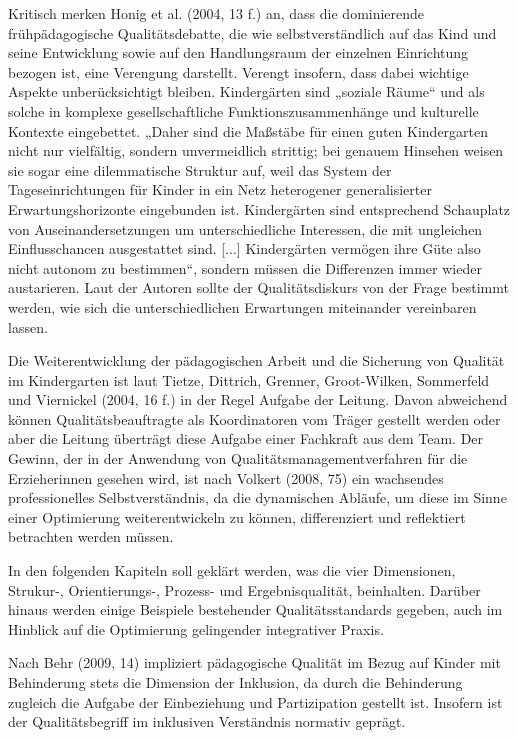 Kritisch merken Honig et al. (2004, 13 f.) an, dass die dominierende frühpädagogische Qualitätsdebatte, die wie selbstverständlich auf das Kind und seine Entwicklung sowie auf den Handlungsraum der einzelnen Einrichtung bezogen ist, eine Verengung darstellt. Verengt insofern, dass dabei wichtige Aspekte unberücksichtigt bleiben. Kindergärten sind „soziale Räume“ und als solche in komplexe gesellschaftliche Funktionszusammenhänge und kulturelle Kontexte eingebettet. „Daher sind die Maßstäbe für einen guten Kindergarten nicht nur vielfältig, sondern unvermeidlich strittig; bei genauem Hinsehen weisen sie sogar eine dilemmatische Struktur auf, weil das System der Tageseinrichtungen für Kinder in ein Netz heterogener generalisierter Erwartungshorizonte eingebunden ist. Kindergärten sind entsprechend Schauplatz von Auseinandersetzungen um unterschiedliche Interessen, die mit ungleichen Einflusschancen ausgestattet sind. [...] Kindergärten vermögen ihre Güte also nicht autonom zu bestimmen“, sondern müssen die Differenzen immer wieder austarieren. 
Laut der Autoren sollte der Qualitätsdiskurs von der Frage bestimmt werden, wie sich die unterschiedlichen Erwartungen miteinander vereinbaren lassen.

Die Weiterentwicklung der pädagogischen Arbeit und die Sicherung von Qualität im Kindergarten ist laut Tietze, Dittrich, Grenner, Groot-Wilken, Sommerfeld und Viernickel (2004, 16 f.) in der Regel Aufgabe der Leitung. Davon abweichend können Qualitätsbeauftragte als Koordinatoren vom Träger gestellt werden oder aber die Leitung überträgt diese Aufgabe einer Fachkraft aus dem Team. 
Der Gewinn, der in der Anwendung von Qualitätsmanagementverfahren für die Erzieherinnen gesehen wird, ist nach Volkert (2008, 75) ein  wachsendes professionelles Selbstverständnis, da die dynamischen Abläufe, um diese im Sinne einer Optimierung weiterentwickeln zu können, differenziert und reflektiert betrachten werden müssen.

In den folgenden Kapiteln soll geklärt werden, was die vier Dimensionen, Strukur-, Orientierungs-, Prozess- und Ergebnisqualität, beinhalten. Darüber hinaus werden einige Beispiele bestehender Qualitätsstandards gegeben, auch im Hinblick auf die Optimierung gelingender integrativer Praxis. 

Nach Behr (2009, 14) impliziert pädagogische Qualität im Bezug auf Kinder mit Behinderung stets die Dimension der Inklusion, da durch die Behinderung zugleich die Aufgabe der Einbeziehung und Partizipation gestellt ist. Insofern ist der Qualitätsbegriff im inklusiven Verständnis normativ geprägt. 

